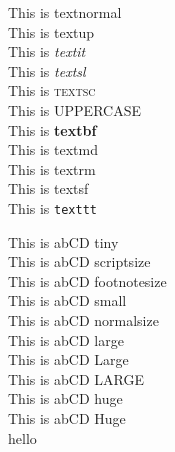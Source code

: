 \documentclass[12pt, a4paper]{report}
\begin{document}
This is \textnormal{textnormal}\\ This is \textup{textup}\\
This is \textit{textit}\\ This is \textsl{textsl}\\
This is \textsc{textsc}\\ This is \uppercase{uppercase}\\
This is \textbf{textbf}\\ This is \textmd{textmd}\\
This is \textrm{textrm}\\
This is \textsf{textsf}\\ This is \texttt{texttt}\\


\vfill

{This is \tiny abCD tiny}\\
{This is \scriptsize abCD scriptsize}\\
{This is \footnotesize abCD footnotesize}\\
{This is \small abCD small}\\
{This is \normalsize abCD normalsize}\\
{This is \large abCD large}\\
{This is \Large abCD Large}\\
{This is \LARGE abCD LARGE}\\
{This is \huge abCD huge}\\
{This is \Huge abCD Huge}\\


hello














\end{document}
